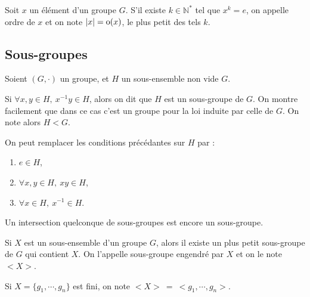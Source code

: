 \begin{defi}

 Soit $x$ un élément d'un groupe $G$. S'il existe $k \in \mathbb{N}^*$ tel que
$x^k = e$, on appelle ordre de $x$ et on note $|x| = \textnormal{o}(x)$, le plus
petit des tels $k$.
\end{defi}


\subsection{Sous-groupes}
\vspace{0.5em}

\begin{defiprop}

 Soient $(G,\cdotp)$ un groupe, et $H$ un sous-ensemble non vide $G$.

 Si $\forall x,y \in H,\ x^{-1}y\in H$, alors on dit que $H$ est un sous-groupe
de $G$. On montre facilement que dans ce cas c'est un groupe pour la loi induite
par celle de $G$. On note alors $H < G$.
\end{defiprop}

\begin{example}[Remarque]
 On peut remplacer les conditions précédantes sur $H$ par :
\begin{enumerate}
 \item $e\in H$,
 \item $\forall x,y\in H,\ xy \in H$,
 \item $\forall x \in H,\ x^{-1} \in H$.
\end{enumerate}
\end{example}

\begin{prop}
 
Un intersection quelconque de sous-groupes est encore un sous-groupe.
\end{prop}

\begin{defitheo}

 Si $X$ est un sous-ensemble d'un groupe $G$, alors il existe un plus petit
sous-groupe de $G$ qui contient $X$. On l'appelle sous-groupe engendré par $X$
et on le note $<X>$.

Si $X = \{g_1,\cdots,g_n\}$ est fini, on note $<X>\ =\ <g_1,\cdots,g_n>$.
\end{defitheo}


